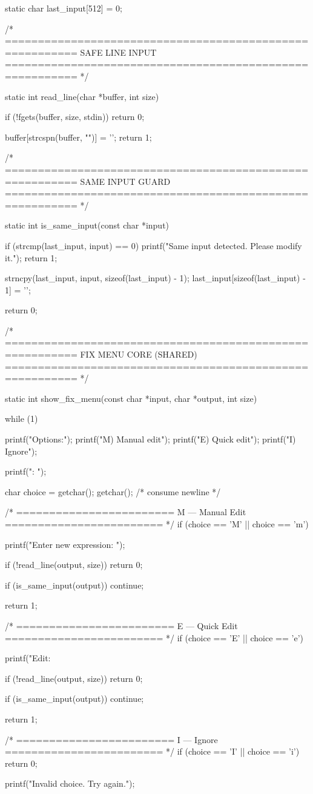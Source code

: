 \documentclass{article}
\begin{document}
static char last_input[512] = {0};

/* =========================================================
   SAFE LINE INPUT
========================================================= */

static int read_line(char *buffer, int size)
{
    if (!fgets(buffer, size, stdin))
        return 0;

    buffer[strcspn(buffer, "\n")] = '\0';
    return 1;
}

/* =========================================================
   SAME INPUT GUARD
========================================================= */

static int is_same_input(const char *input)
{
    if (strcmp(last_input, input) == 0)
    {
        printf("\n[SYSTEM] Same input detected. Please modify it.\n");
        return 1;
    }

    strncpy(last_input, input, sizeof(last_input) - 1);
    last_input[sizeof(last_input) - 1] = '\0';

    return 0;
}

/* =========================================================
   FIX MENU CORE (SHARED)
========================================================= */

static int show_fix_menu(const char *input, char *output, int size)
{
    while (1)
    {
        printf("\nFix Options:\n\n");
        printf("M) Manual edit\n");
        printf("E) Quick edit\n");
        printf("I) Ignore\n");

        printf("\nSelect: ");

        char choice = getchar();
        getchar(); /* consume newline */

        /* ========================
           M — Manual Edit
        ======================== */
        if (choice == 'M' || choice == 'm')
        {
            printf("Enter new expression: ");

            if (!read_line(output, size))
                return 0;

            if (is_same_input(output))
                continue;

            return 1;
        }

        /* ========================
           E — Quick Edit
        ======================== */
        if (choice == 'E' || choice == 'e')
        {
            printf("Edit:\n%

            if (!read_line(output, size))
                return 0;

            if (is_same_input(output))
                continue;

            return 1;
        }

        /* ========================
           I — Ignore
        ======================== */
        if (choice == 'I' || choice == 'i')
        {
            return 0;
        }

        printf("Invalid choice. Try again.\n");
    }
}
\end{document}
